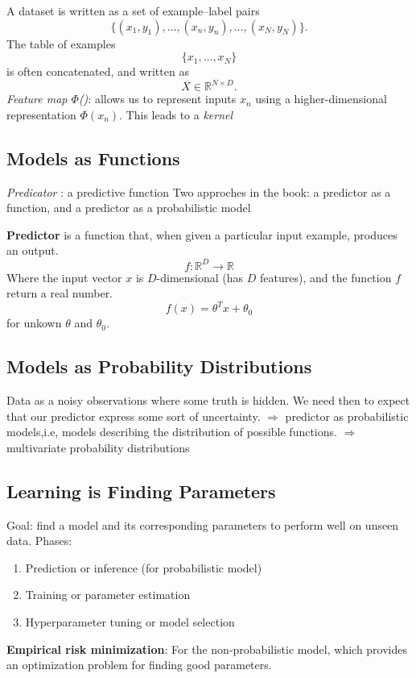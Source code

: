 A dataset is written as a set of example–label pairs
\[
\{(x_1, y_1), \ldots, (x_n, y_n), \ldots, (x_N, y_N)\}.
\]
The table of examples
\[
\{x_1, \ldots, x_N\}
\]
is often concatenated, and written as
\[
X \in \mathbb{R}^{N \times D}.
\]
\textit{Feature map $\Phi$()}: allows us to represent inputs $x_n$ using a higher-dimensional representation  $\Phi(x_n)$. This leads to a \textit{kernel}

\subsection{Models as Functions}
\textit{Predicator} : a predictive function
Two approches in the book: a predictor as a function, and a predictor as a probabilistic model

\textbf{Predictor} is a function that, when given a particular input example, produces an output. \[f : \mathbb{R}^D \to \mathbb{R} \tag{8.1}\]
Where the input vector $x$ is $D$-dimensional (has $D$ features), and the function $f$  return a real number.
\[
f(x) = \theta^T x + \theta_0 \tag{8.2}
\]
for unkown $\theta$ and $\theta_0$.

\subsection{Models as Probability Distributions}
Data as a noisy observations where some truth is hidden. We need then to expect that our predictor express some sort of uncertainty. $\Rightarrow$ predictor as probabilistic models,i.e, models describing the distribution of possible functions. $\Rightarrow$ multivariate probability distributions

\subsection{Learning is Finding Parameters}

Goal: find a model and its corresponding parameters to perform well on unseen data. 
Phases:
\begin{enumerate} 
	\item Prediction or inference (for probabilistic model)
	\item Training or parameter estimation
	\item Hyperparameter tuning or model selection
\end{enumerate}

\textbf{Empirical risk minimization}: For the non-probabilistic model, which provides an optimization problem for finding good parameters.

